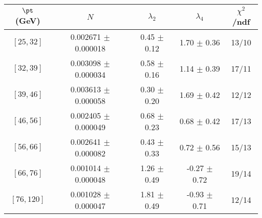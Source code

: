 \begin{tabular}{c||c|c|c|c}
$\pt$ (GeV) & $N$ & $\lambda_{2}$ & $\lambda_4$  & $\chi^2$/ndf  \\
\hline
$[25, 32]$ & 0.002671 $\pm$ 0.000018 & 0.45 $\pm$ 0.12 & 1.70 $\pm$ 0.36 & 13/10\\
$[32, 39]$ & 0.003098 $\pm$ 0.000034 & 0.58 $\pm$ 0.16 & 1.14 $\pm$ 0.39 & 17/11\\
$[39, 46]$ & 0.003613 $\pm$ 0.000058 & 0.30 $\pm$ 0.20 & 1.69 $\pm$ 0.42 & 12/12\\
$[46, 56]$ & 0.002405 $\pm$ 0.000049 & 0.68 $\pm$ 0.23 & 0.68 $\pm$ 0.42 & 17/13\\
$[56, 66]$ & 0.002641 $\pm$ 0.000082 & 0.43 $\pm$ 0.33 & 0.72 $\pm$ 0.56 & 15/13\\
$[66, 76]$ & 0.001014 $\pm$ 0.000048 & 1.26 $\pm$ 0.49 & -0.27 $\pm$ 0.72 & 19/14\\
$[76, 120]$ & 0.001028 $\pm$ 0.000047 & 1.81 $\pm$ 0.49 & -0.93 $\pm$ 0.71 & 12/14\\
\end{tabular}
